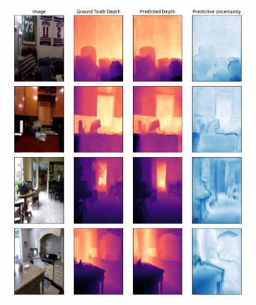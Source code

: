 \begin{figure}[ht!]
    \centering
    \caption{Visualization of the predicted depth and predictive uncertainty estimates of \NatPNacro{} per pixel on the NYU Depth v2 dataset. \NatPNacro{} predicts accurate depth uncertainty and reasonably assigns higher uncertainty to object edges.}
    \label{fig:nyu-uncertainty-visualization}
    \begin{subfigure}[t]{.5\textwidth}
        \centering
        \includegraphics[width=1\textwidth]{sections/007_iclr2022/resources/appendix/nyu-42-new-ii.pdf}
    \end{subfigure}%
    \begin{subfigure}[t]{.5\textwidth}
        \centering

\end{subfigure}
\end{figure}

